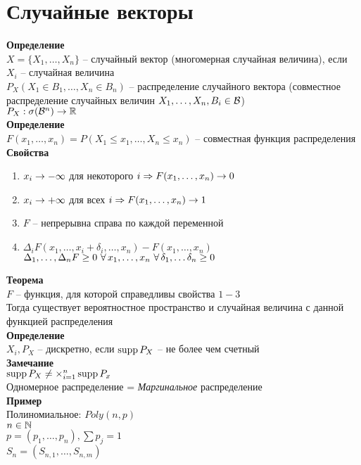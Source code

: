 \documentclass[12pt]{article}
\begin{document}
\section{Случайные векторы}
\textbf{Определение}\\
$X = \{X_1, \ldots, X_n\}$ -- случайный вектор (многомерная случайная величина), если $X_i$ -- случайная величина\\
$P_X(X_1 \in B_1, \ldots, X_n \in B_n)$ -- распределение случайного вектора (совместное распределение случайных величин $X_1, \ldots, X_n, B_i \in \mathcal{B}$)\\
$P_X: \sigma(\mathcal{B}^n)\rightarrow \mathbb{R}$\\
\textbf{Определение}\\
$F(x_1, \ldots, x_n) = P(X_1 \leq x_1, \ldots, X_n \leq x_n)$ -- совместная функция распределения\\
\textbf{Свойства}
\begin{enumerate}
    \item $x_i \rightarrow -\infty$ для некоторого $i \Rightarrow F(x_1,\ldots, x_n) \rightarrow 0$
    \item $x_i \rightarrow +\infty$ для всех $i \Rightarrow F(x_1,\ldots, x_n) \rightarrow 1$
    \item $F$ -- непрерывна справа по каждой переменной
    \item $\Delta_i F(x_1, \ldots, x_i + \delta_i, \ldots, x_n) - F(x_1, \ldots, x_n)$\\
    $\Delta_1, \ldots, \Delta_n F \geq 0\ \forall\, x_1, \ldots, x_n\ \forall\, \delta_1, \ldots \delta_n \geq 0$
\end{enumerate}
\textbf{Теорема}\\
$F$ -- функция, для которой справедливы свойства $1-3$\\
Тогда существует вероятностное пространство и случайная величина с данной функцией распределения\\
\textbf{Определение}\\
$X_i, P_X$ -- дискретно, если $\operatorname{supp} P_X$ -- не более чем счетный\\
\textbf{Замечание}\\
$\operatorname{supp} P_X \neq \times_{i=1}^n \operatorname{supp} P_x$\\
Одномерное распределение = \textit{Маргинальное} распределение\\
\textbf{Пример}\\
Полиномиальное: $Poly(n, p)$\\
$n \in \mathbb{N}$\\
$p = (p_1, \ldots, p_n), \sum p_j = 1$\\
$S_n = (S_{n,1}, \ldots, S_{n,m})$\\
\end{document}
